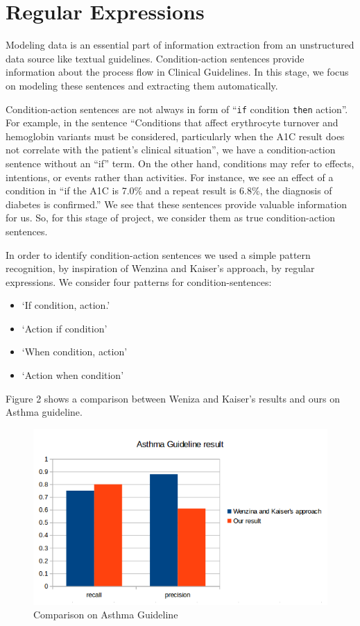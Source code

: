 \documentclass[12pt,letterpaper]{article}
\begin{document}
\section{Regular Expressions}
Modeling data is an essential part of information extraction from an unstructured data source like textual guidelines. Condition-action sentences provide information about the process flow in Clinical Guidelines. In this stage, we focus on modeling these sentences and extracting them automatically.

Condition-action sentences are not always in form of ``\texttt{if} condition \texttt{then} action''. For example, in the sentence ``Conditions that affect erythrocyte turnover and hemoglobin variants must be considered, particularly when the A1C result does not correlate with the patient's clinical situation'', we have a condition-action sentence without an ``if'' term. On the other hand, conditions may refer to effects, intentions, or events rather than activities. For instance, we see an effect of a condition in ``if the A1C is 7.0\% and a repeat result is 6.8\%, the diagnosis of diabetes is confirmed.'' We see that these sentences provide valuable information for us. So, for this stage of project, we consider them as true condition-action sentences. 

In order to identify condition-action sentences we used a simple pattern recognition, by inspiration of Wenzina and Kaiser's approach\cite{wenzina2013identifying},  by regular expressions. We consider four patterns for condition-sentences: 
\begin{itemize}
	\item `If condition, action.'
	\item `Action if condition'
	\item `When condition, action'
	\item `Action when condition'
\end{itemize}
Figure 2 shows a comparison between Weniza and Kaiser's results and ours on Asthma guideline.
\begin{figure}
\includegraphics[width=\textwidth]{Comparison}
\caption{Comparison on Asthma Guideline}
\end{figure}
\end{document}
